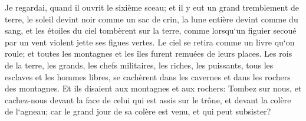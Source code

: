 \verse Je regardai, quand il ouvrit le sixième sceau; et il y eut un grand tremblement de terre, le soleil devint noir comme un sac de crin, la lune entière devint comme du sang, 
\verse et les étoiles du ciel tombèrent sur la terre, comme lorsqu`un figuier secoué par un vent violent jette ses figues vertes. 
\verse Le ciel se retira comme un livre qu`on roule; et toutes les montagnes et les îles furent remuées de leurs places. 
\verse Les rois de la terre, les grands, les chefs militaires, les riches, les puissants, tous les esclaves et les hommes libres, se cachèrent dans les cavernes et dans les rochers des montagnes. 
\verse Et ils disaient aux montagnes et aux rochers: Tombez sur nous, et cachez-nous devant la face de celui qui est assis sur le trône, et devant la colère de l`agneau; 
\verse car le grand jour de sa colère est venu, et qui peut subsister? 

